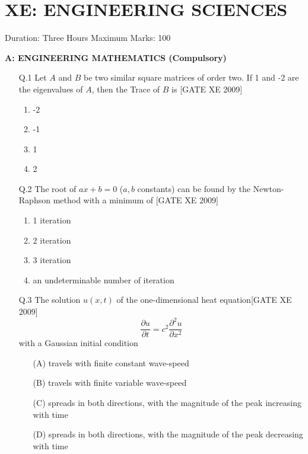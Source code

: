 \documentclass[journal,12pt,onecolumn]{IEEEtran}
\theoremstyle{remark}
\begin{document}
\section*{\hspace{1cm}XE: ENGINEERING SCIENCES}

     Duration: Three Hours \hspace{8 cm}  Maximum Marks: 100




\textbf{A: ENGINEERING MATHEMATICS (Compulsory)}

\vspace{0.5cm}

\begin{enumerate}

    \item[Q.1] Let $A$ and $B$ be two similar square matrices of order two. If 1 and -2 are the eigenvalues of $A$, then the Trace of $B$ is \hfill[GATE XE 2009]\\
    \begin{multicols}{4}
  \begin{enumerate}
      \item -2
       \item -1
       \item 1
        \item 2
  \end{enumerate}      
    \end{multicols}

  

    \item[Q.2] The root of $ax + b = 0$ ($a,b$ constants) can be found by the Newton-Raphson method with a minimum of \hfill[GATE XE 2009]
    
 \begin{multicols}{2}
\begin{enumerate}
 
\item  1 iteration 
\item 2 iteration 
\item 3 iteration 
\item an undeterminable number of iteration
\end{enumerate}
 \end{multicols}
    
   

   
    \item[Q.3] The solution $u(x,t)$ of the one-dimensional heat equation\hfill[GATE XE 2009]
    $$
        \frac{\partial u}{\partial t} = c^2 \frac{\partial^2 u}{\partial x^2}
    $$
    with a Gaussian initial condition
    \begin{enumerate}
        \item[(A)] travels with finite constant wave-speed
        \item[(B)] travels with finite variable wave-speed
        \item[(C)] spreads in both directions, with the magnitude of the peak increasing with time
        \item[(D)] spreads in both directions, with the magnitude of the peak decreasing with time
    \end{enumerate}


\end{enumerate}
\end{document}
